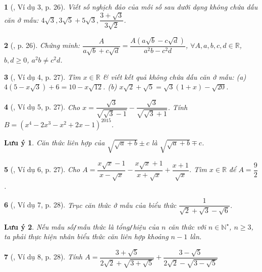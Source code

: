 \documentclass{article}
\newtheorem{baitoan}{}
\newtheorem{luuy}{Lưu ý}
\begin{document}
\begin{baitoan}[\cite{Binh_boi_duong_Toan_9_tap_1}, Ví dụ 3, p. 26]
	Viết số nghịch đảo của mỗi số sau dưới dạng không chứa dấu căn ở mẫu: $4\sqrt{3},3\sqrt{5} + 5\sqrt{3},\dfrac{3 + \sqrt{3}}{3\sqrt{2}}$.
\end{baitoan}

\begin{baitoan}[\cite{Binh_boi_duong_Toan_9_tap_1}, p. 26]
	Chứng minh: $\dfrac{A}{a\sqrt{b} + c\sqrt{d}} = \dfrac{A(a\sqrt{b} - c\sqrt{d})}{a^2b - c^2d}$, $\forall A,a,b,c,d\in\mathbb{R}$, $b,d\ge0$, $a^2b\ne c^2d$.
\end{baitoan}

\begin{baitoan}[\cite{Binh_boi_duong_Toan_9_tap_1}, Ví dụ 4, p. 27]
	Tìm $x\in\mathbb{R}$ \& viết kết quả không chứa dấu căn ở mẫu: (a) $4(5 - x\sqrt{3}) + 6 = 10 - x\sqrt{12}$. (b) $x\sqrt{2} + \sqrt{5} = \sqrt{3}(1 + x) - \sqrt{20}$.
\end{baitoan}

\begin{baitoan}[\cite{Binh_boi_duong_Toan_9_tap_1}, Ví dụ 5, p. 27]
	Cho $x = \dfrac{\sqrt{3}}{\sqrt{\sqrt{3} - 1}} - \dfrac{\sqrt{3}}{\sqrt{\sqrt{3} + 1}}$. Tính $B = (x^4 - 2x^3 - x^2 + 2x - 1)^{2015}$.
\end{baitoan}

\begin{luuy}
	Căn thức liên hợp của $\sqrt{\sqrt{a} + b}\pm c$ là $\sqrt{\sqrt{a} + b}\mp c$.
\end{luuy}

\begin{baitoan}[\cite{Binh_boi_duong_Toan_9_tap_1}, Ví dụ 6, p. 27]
	Cho $A = \dfrac{x\sqrt{x} - 1}{x - \sqrt{x}} - \dfrac{x\sqrt{x} + 1}{x + \sqrt{x}} + \dfrac{x + 1}{\sqrt{x}}$. Tìm $x\in\mathbb{R}$ để $A = \dfrac{9}{2}$.
\end{baitoan}

\begin{baitoan}[\cite{Binh_boi_duong_Toan_9_tap_1}, Ví dụ 7, p. 28]
	Trục căn thức ở mẫu của biểu thức $\dfrac{1}{\sqrt{2} + \sqrt{3} - \sqrt{6}}$.
\end{baitoan}

\begin{luuy}
	Nếu mẫu số{\tt/}mẫu thức là tổng{\tt/}hiệu của $n$ căn thức với $n\in\mathbb{N}^\star$, $n\ge3$, ta phải thực hiện nhân biểu thức căn liên hợp khoảng $n - 1$ lần.
\end{luuy}

\begin{baitoan}[\cite{Binh_boi_duong_Toan_9_tap_1}, Ví dụ 8, p. 28]
	Tính $A = \dfrac{3 + \sqrt{5}}{2\sqrt{2} + \sqrt{3 + \sqrt{5}}} + \dfrac{3 - \sqrt{5}}{2\sqrt{2} - \sqrt{3 - \sqrt{5}}}$
\end{baitoan}
\end{document}
